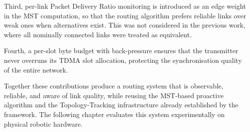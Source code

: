 Third, per-link Packet Delivery Ratio monitoring is introduced as an edge weight in the
MST computation, so that the routing algorithm prefers reliable links over weak ones when
alternatives exist. This was not considered in the previous work, where all nominally
connected links were treated as equivalent.

Fourth, a per-slot byte budget with back-pressure ensures that the transmitter never
overruns its TDMA slot allocation, protecting the synchronisation quality of the entire
network.

Together these contributions produce a routing system that is observable, reliable, and
aware of link quality, while reusing the MST-based proactive algorithm and the
Topology-Tracking infrastructure already established by the framework. The following
chapter evaluates this system experimentally on physical robotic hardware.
